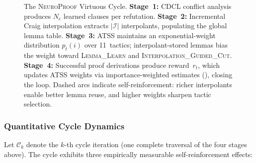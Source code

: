 \documentclass[conference]{IEEEtran}
\newcommand{\NP}{\textsc{NeuroProof}}
\begin{document}
\begin{figure}[t]
  \caption{The \NP{} Virtuous Cycle.  \textbf{Stage~1:} CDCL conflict
    analysis produces $N_c$ learned clauses per refutation.
    \textbf{Stage~2:} Incremental Craig interpolation extracts $|\mathcal{I}|$
    interpolants, populating the global lemma table.
    \textbf{Stage~3:} ATSS maintains an exponential-weight distribution
    $p_t(i)$ over 11~tactics; interpolant-stored lemmas bias the
    weight toward \textsc{Lemma\_Learn} and
    \textsc{Interpolation\_Guided\_Cut}.
    \textbf{Stage~4:} Successful proof derivations produce reward~$r_t$,
    which updates ATSS weights via importance-weighted estimates
    (), closing the loop.  Dashed arcs indicate
    self-reinforcement: richer interpolants enable better lemma
    reuse, and higher weights sharpen tactic selection.}
  \label{fig:virtuous-cycle}
\end{figure}

\subsubsection*{Quantitative Cycle Dynamics}

Let $\mathcal{C}_k$ denote the $k$-th cycle iteration (one complete
traversal of the four stages above).  The cycle exhibits three
empirically measurable self-reinforcement effects:
\end{document}
